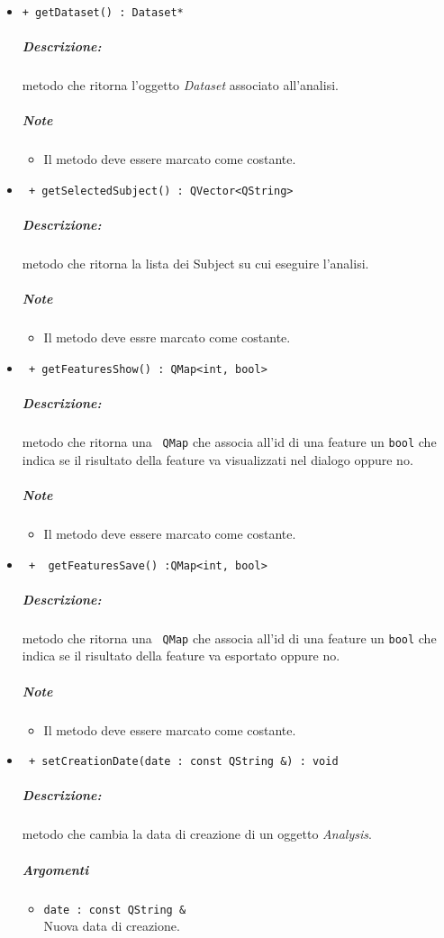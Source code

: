 \begin{itemize}
	\item \color{blue}\verb!+ getDataset() : Dataset*!\\
	\color{black}\subparagraph{Descrizione:} metodo che ritorna l'oggetto \textsl{Dataset} associato all'analisi.
	\subparagraph{Note}
		\begin{itemize}
			\item Il metodo deve essere marcato come costante.
		\end{itemize}
		
	\item \color{blue}\verb! + getSelectedSubject() : QVector<QString>!\\
	\color{black}\subparagraph{Descrizione:} metodo che ritorna la lista dei Subject\g{} su cui eseguire l'analisi.
	\subparagraph{Note}
		\begin{itemize}
			\item Il metodo deve essre marcato come costante.
		\end{itemize}
		
	\item \color{blue}\verb! + getFeaturesShow() : QMap<int, bool>!\\
	\color{black}\subparagraph{Descrizione:} metodo che ritorna una \verb! QMap! che associa all'id di una feature un \verb!bool! che indica se il risultato della feature\g{} va visualizzati nel dialogo oppure no.
	\subparagraph{Note}
		\begin{itemize}
			\item Il metodo deve essere marcato come costante.
		\end{itemize}
		
	\item \color{blue}\verb! +  getFeaturesSave() :QMap<int, bool>!\\
	\color{black}\subparagraph{Descrizione:} metodo che ritorna una \verb! QMap! che associa all'id di una feature un \verb!bool! che indica se il risultato della feature\g{} va esportato oppure no.
		\subparagraph{Note}
			\begin{itemize}
				\item Il metodo deve essere marcato come costante.
			\end{itemize}
			
	\item \color{blue}\verb! + setCreationDate(date : const QString &) : void!\\
	\color{black}\subparagraph{Descrizione:} metodo che cambia la data di creazione di un oggetto \textsl{Analysis}.
	\subparagraph{Argomenti}
		\begin{itemize}
			\item \color{RoyalPurple}\verb!date : const QString &!\\
			\color{black}Nuova data di creazione.
		\end{itemize}
		

\end{itemize}
